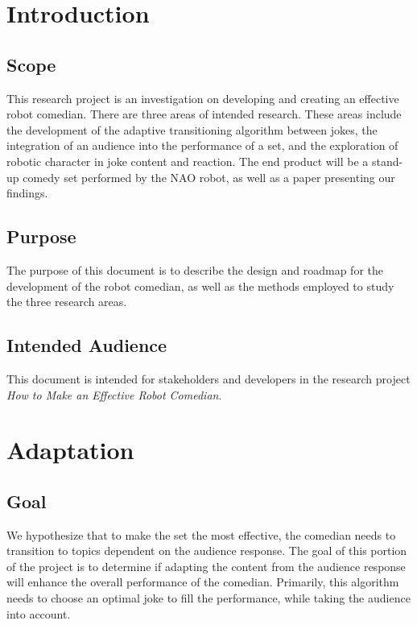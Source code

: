 \documentclass[onecolumn, draftclsnofoot,10pt, compsoc]{IEEEtran}
\begin{document}
\section{Introduction}

\subsection{Scope}
	This research project is an investigation on developing and creating an effective robot comedian.
	There are three areas of intended research.
	These areas include the development of the adaptive transitioning algorithm between jokes, the integration of an audience into the performance of a set, and the exploration of robotic character in joke content and reaction.
  The end product will be a stand-up comedy set performed by the NAO robot, as well as a paper presenting our findings.


  \subsection{Purpose}
	The purpose of this document is to describe the design and roadmap for the development of the robot comedian, as well as the methods employed to study the three research areas.

\subsection{Intended Audience}
	This document is intended for stakeholders and developers in the research project \textit{How to Make an Effective Robot Comedian}.


\section{Adaptation}
\subsection{Goal}
  We hypothesize that to make the set the most effective, the comedian needs to transition to topics dependent on the audience response. The goal of this portion of the project is to determine if adapting the content from the audience response will enhance the overall performance of the comedian. Primarily, this algorithm needs to choose an optimal joke to fill the performance, while taking the audience into account.
\end{document}
